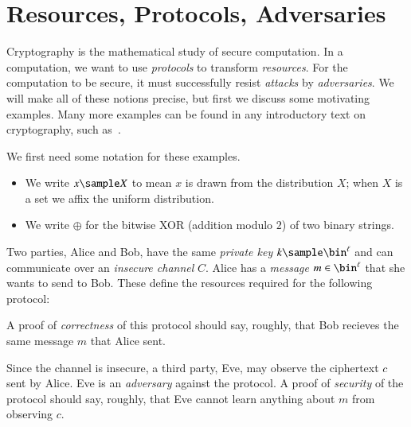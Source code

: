 
\section{Resources, Protocols, Adversaries}

Cryptography is the mathematical study of secure computation. In a computation,
we want to use \emph{protocols} to transform \emph{resources}. For the
computation to be secure, it must successfully resist \emph{attacks} by
\emph{adversaries}. We will make all of these notions precise, but first we
discuss some motivating examples. Many more examples can be found in any
introductory text on cryptography, such as~\cite{katz-lindell-2014, rosulek-2021,
pass-shelat-2020}.

\begin{ntn}
  We first need some notation for these examples.
  \begin{itemize}
    \item We write $x\sample X$ to mean $x$ is drawn from the distribution
      $X$; when $X$ is a set we affix the uniform distribution.
    \item We write $\oplus$ for the bitwise XOR (addition modulo $2$) of two
      binary strings.
  \end{itemize}
\end{ntn}

\begin{ex}\label{ex:one-time pad}
  Two parties, Alice and Bob, have the same \emph{private key}
  $k\sample\bin^\ell$ and can communicate over an \emph{insecure channel} $C$.
  Alice has a \emph{message} $m\in\bin^\ell$ that she wants to send to Bob.
  These define the resources required for the following protocol:


  \noindent
  A proof of \emph{correctness} of this protocol should say, roughly, that Bob
  recieves the same message $m$ that Alice sent.

  Since the channel is insecure, a third party, Eve, may observe the ciphertext
  $c$ sent by Alice. Eve is an \emph{adversary} against the protocol. A proof of
  \emph{security} of the protocol should say, roughly, that Eve cannot learn
  anything about $m$ from observing $c$.
\end{ex}

